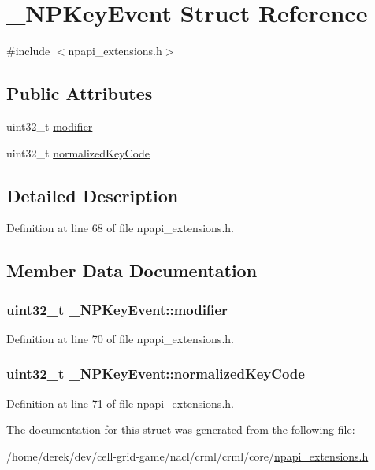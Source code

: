 \hypertarget{struct___n_p_key_event}{
\section{\_\-NPKeyEvent Struct Reference}
\label{struct___n_p_key_event}
}


{\ttfamily \#include $<$npapi\_\-extensions.h$>$}

\subsection*{Public Attributes}
\begin{DoxyCompactItemize}
\item 
uint32\_\-t \hyperlink{struct___n_p_key_event_a3495aa4058a75498f442ab300b30c36d}{modifier}
\item 
uint32\_\-t \hyperlink{struct___n_p_key_event_a69797b62fafa508f0a351eb470fd8404}{normalizedKeyCode}
\end{DoxyCompactItemize}


\subsection{Detailed Description}


Definition at line 68 of file npapi\_\-extensions.h.



\subsection{Member Data Documentation}
\hypertarget{struct___n_p_key_event_a3495aa4058a75498f442ab300b30c36d}{
\subsubsection[{modifier}]{\setlength{\rightskip}{0pt plus 5cm}uint32\_\-t {\bf \_\-NPKeyEvent::modifier}}}
\label{struct___n_p_key_event_a3495aa4058a75498f442ab300b30c36d}


Definition at line 70 of file npapi\_\-extensions.h.

\hypertarget{struct___n_p_key_event_a69797b62fafa508f0a351eb470fd8404}{
\subsubsection[{normalizedKeyCode}]{\setlength{\rightskip}{0pt plus 5cm}uint32\_\-t {\bf \_\-NPKeyEvent::normalizedKeyCode}}}
\label{struct___n_p_key_event_a69797b62fafa508f0a351eb470fd8404}


Definition at line 71 of file npapi\_\-extensions.h.



The documentation for this struct was generated from the following file:\begin{DoxyCompactItemize}
\item 
/home/derek/dev/cell-\/grid-\/game/nacl/crml/crml/core/\hyperlink{npapi__extensions_8h}{npapi\_\-extensions.h}\end{DoxyCompactItemize}
